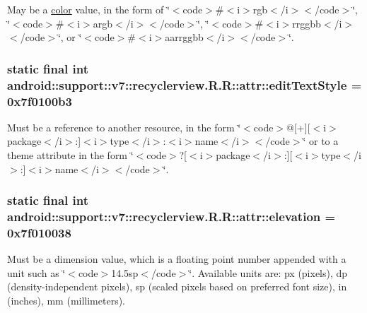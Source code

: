 May be a \hyperlink{classandroid_1_1support_1_1v7_1_1recyclerview_1_1_r_1_1color}{color} value, in the form of \char`\"{}$<$code$>$\#$<$i$>$rgb$<$/i$>$$<$/code$>$\char`\"{}, \char`\"{}$<$code$>$\#$<$i$>$argb$<$/i$>$$<$/code$>$\char`\"{}, \char`\"{}$<$code$>$\#$<$i$>$rrggbb$<$/i$>$$<$/code$>$\char`\"{}, or \char`\"{}$<$code$>$\#$<$i$>$aarrggbb$<$/i$>$$<$/code$>$\char`\"{}. \hypertarget{classandroid_1_1support_1_1v7_1_1recyclerview_1_1_r_1_1attr_ceea3f714b272c68e095ece5b5b44694}{
\subsubsection[{editTextStyle}]{\setlength{\rightskip}{0pt plus 5cm}static final int android::support::v7::recyclerview.R.R::attr::editTextStyle = 0x7f0100b3}}
\label{classandroid_1_1support_1_1v7_1_1recyclerview_1_1_r_1_1attr_ceea3f714b272c68e095ece5b5b44694}


Must be a reference to another resource, in the form \char`\"{}$<$code$>$@\mbox{[}+\mbox{]}\mbox{[}$<$i$>$package$<$/i$>$:\mbox{]}$<$i$>$type$<$/i$>$:$<$i$>$name$<$/i$>$$<$/code$>$\char`\"{} or to a theme attribute in the form \char`\"{}$<$code$>$?\mbox{[}$<$i$>$package$<$/i$>$:\mbox{]}\mbox{[}$<$i$>$type$<$/i$>$:\mbox{]}$<$i$>$name$<$/i$>$$<$/code$>$\char`\"{}. \hypertarget{classandroid_1_1support_1_1v7_1_1recyclerview_1_1_r_1_1attr_26958e40fe347c58f2e51064e214e3ec}{
\subsubsection[{elevation}]{\setlength{\rightskip}{0pt plus 5cm}static final int android::support::v7::recyclerview.R.R::attr::elevation = 0x7f010038}}
\label{classandroid_1_1support_1_1v7_1_1recyclerview_1_1_r_1_1attr_26958e40fe347c58f2e51064e214e3ec}


Must be a dimension value, which is a floating point number appended with a unit such as \char`\"{}$<$code$>$14.5sp$<$/code$>$\char`\"{}. Available units are: px (pixels), dp (density-independent pixels), sp (scaled pixels based on preferred font size), in (inches), mm (millimeters). 

